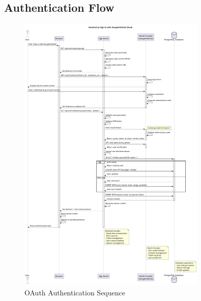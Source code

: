 \subsection{Authentication Flow}
\begin{figure}[H]
    \centering
    \includegraphics[width=0.8\textwidth]{conception/SprintII/sequence_diagrams/sequence_authentication_1_1_AuthenticateUsingGoogleAccount.png}
    \caption{OAuth Authentication Sequence}
    \label{fig:seq_google_auth}
\end{figure}

